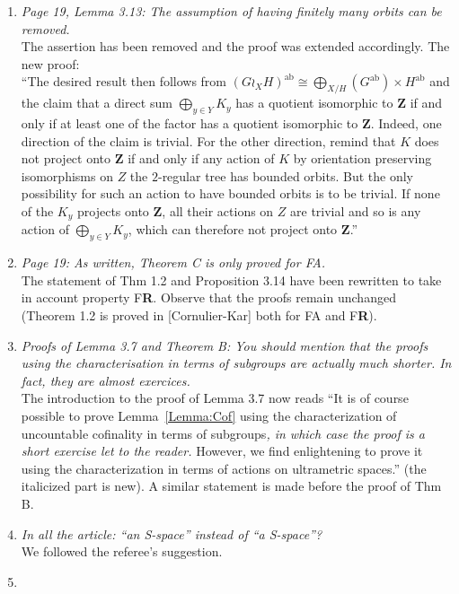 \documentclass[english,a4paper]{article}
\DeclareMathOperator\ab{ab}
\newcommand*{\FA}{FA}
\newcommand*{\FR}{F\textbf{R}}
\newcommand*\Z{\mathbf{Z}}
\begin{document}
\begin{enumerate}
%
\item\textit{Page 19, Lemma 3.13: The assumption of having finitely many orbits can be removed.}\\
The assertion has been removed and the proof was extended accordingly. The new proof:\\
``The desired result then follows from $(G\wr_XH)^{\ab}\cong \bigoplus_{X/H}(G^{\ab})\times H^{\ab}$ and the claim that a direct sum $\bigoplus_{y\in Y}K_y$ has a quotient isomorphic to $\Z$ if and only if at least one of the factor has a quotient isomorphic to $\Z$.
Indeed, one direction of the claim is trivial.
For the other direction, remind that $K$ does not project onto $\Z$ if and only if any action of $K$ by orientation preserving isomorphisms on $Z$ the $2$-regular tree has bounded orbits. But the only possibility for such an action to have bounded orbits is to be trivial.
If none of the $K_y$ projects onto $\Z$, all their actions on $Z$ are trivial and so is any action of $\bigoplus_{y\in Y}K_y$, which can therefore not project onto $\Z$.''
%
\item\textit{Page 19: As written, Theorem C is only proved for \FA.}\\
The statement of Thm 1.2 and Proposition 3.14 have been rewritten to take in account property \FR. Observe that the proofs remain unchanged (Theorem 1.2 is proved in [Cornulier-Kar] both for \FA{} and \FR).
%
\item\textit{Proofs of Lemma 3.7 and Theorem B: You should mention that the proofs using the characterisation in terms of subgroups are actually much shorter. In fact, they are almost exercices.}\\
The introduction to the proof of Lemma 3.7 now reads ``It is of course possible to prove Lemma~\ref{Lemma:Cof} using the characterization of uncountable cofinality in terms of subgroups\emph{, in which case the proof is a short exercise let to the reader.} However, we find enlightening to prove it using the characterization in terms of actions on ultrametric spaces.'' (the italicized part is new).
A similar statement is made before the proof of Thm B.
%
\item\textit{In all the article: “an S-space” instead of “a S-space”?}\\
We followed the referee's suggestion.
%
\item\textit{}\\









\end{enumerate}
\end{document}
